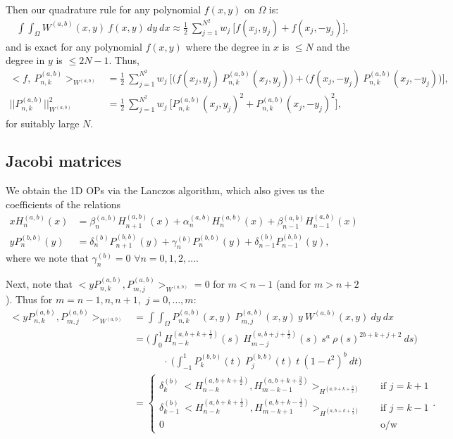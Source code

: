 \documentclass[11pt, oneside]{article}   	%
\newcommand{\half}{\frac{1}{2}}
\newcommand{\Pnk}{P_{n,k}}
\newcommand{\Pnkab}{P_{n,k}^{(a,b)}}
\newcommand{\Wab}{{W^{(a,b)}}}
\newcommand{\Pmjab}{P_{m,j}^{(a,b)}}
\begin{document}
Then our quadrature rule for any polynomial \(f(x,y)\) on \(\Omega\) is:
\begin{align}
\int \int_\Omega W^{(a,b)}(x,y) \: f(x,y) \: dy \: dx \approx \half \: \sum_{j=1}^{N^2} w_j \: \big[ f(x_j, y_j) + f(x_j, -y_j) \big],
\end{align}
and is exact for any polynomial $f(x,y)$ where the degree in $x$ is $\le N$ and the degree in $y$ is $\le 2N-1$. Thus,
\begin{align}
< f, \: \Pnk^{(a,b)} >_{W^{(a,b)}} &= \half \: \sum_{j=1}^{N^2} w_j \: \big[ \big(f(x_j, y_j) \: \Pnk^{(a,b)}(x_j, y_j)\big) +\big(f(x_j, -y_j) \: \Pnk^{(a,b)}(x_j, -y_j)\big) \big], \\
|| \Pnk^{(a,b)} ||_{W^{(a,b)}}^2 &= \half \: \sum_{j=1}^{N^2} w_j \: \big[ \Pnk^{(a,b)}(x_j, y_j)^2 + \Pnk^{(a,b)}(x_j, -y_j)^2 \big],
\end{align}
for suitably large $N$.


\subsection{Jacobi matrices}

We obtain the 1D OPs via the Lanczos algorithm, which also gives us the coefficients of the relations
\begin{align}
x H_n^{(a,b)}(x) &= \beta_n^{(a,b)} H_{n+1}^{(a,b)}(x) + \alpha_n^{(a,b)} H_n^{(a,b)}(x) + \beta_{n-1}^{(a,b)} H_{n-1}^{(a,b)}(x) \\
y P_n^{(b,b)}(y) &= \delta_n^{(b)} P_{n+1}^{(b,b)}(y) + \gamma_n^{(b)} P_n^{(b,b)}(y) + \delta_{n-1}^{(b)} P_{n-1}^{(b,b)}(y),
\end{align}
where we note that \(\gamma_n^{(b)} = 0\) \(\forall n = 0,1,2,\dots\).

Next, note that \(<y \Pnkab, P_{m,j}^{(a,b)}>_\Wab = 0\) for \(m < n-1\) (and for \(m > n+2\)). Thus for \(m = n-1, n, n+1,\) \(j = 0,\dots,m:\)
\begin{align}
<y \Pnkab, P_{m,j}^{(a,b)}>_\Wab &= \int \int_\Omega \Pnkab(x,y) \: \Pmjab(x,y) \: y \: \Wab(x,y) \: dy \: dx \\
&= \Big( \int^1_0 H_{n-k}^{(a, b+k+\half)}(s) \: H_{m-j}^{(a, b+j+\half)}(s) \: s^a \: \rho(s)^{2b+k+j+2} \: ds \Big) \nonumber \\
& \quad \quad \quad\cdot \: \Big( \int^1_{-1} P_k^{(b,b)}(t) \: P_j^{(b,b)}(t) \: t \: (1-t^2)^b \: dt \Big) \\
&= \begin{cases}
    	\delta_k^{(b)} \: <H_{n-k}^{(a, b+k+\half)}, H_{m-k-1}^{(a, b+k+\frac{3}{2})}>_{H^{(a, b+k+\frac{3}{2})}} \quad& \text{if } j = k+1 \\
	\delta_{k-1}^{(b)} \: <H_{n-k}^{(a, b+k+\half)}, H_{m-k+1}^{(a, b+k-\half)}>_{H^{(a, b+k+\half)}} \quad& \text{if } j = k-1 \\
	0 & \text{o/w}
      \end{cases}.
\end{align}
\end{document}
